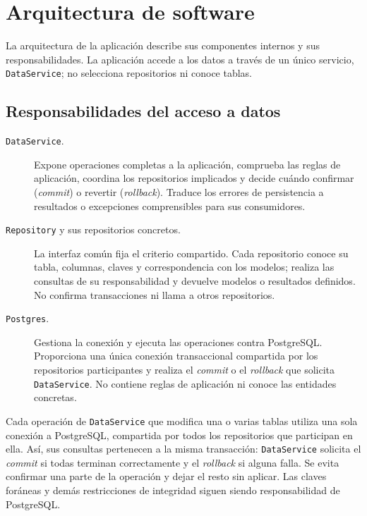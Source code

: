 \chapter{Arquitectura de software}

La arquitectura de la aplicación describe sus componentes internos y sus
responsabilidades. La aplicación accede a los datos a través de un único servicio,
\texttt{DataService}; no selecciona repositorios ni conoce tablas.

\section{Responsabilidades del acceso a datos}

\begin{description}
    \item[\texttt{DataService}.] Expone operaciones completas a la aplicación,
    comprueba las reglas de aplicación, coordina los repositorios implicados y
    decide cuándo confirmar (\textit{commit}) o revertir (\textit{rollback}).
    Traduce los errores de persistencia a resultados o excepciones comprensibles
    para sus consumidores.
    \item[\texttt{Repository} y sus repositorios concretos.] La interfaz común
    fija el criterio compartido. Cada repositorio conoce su tabla, columnas,
    claves y correspondencia con los modelos; realiza las consultas de su
    responsabilidad y devuelve modelos o resultados definidos. No confirma
    transacciones ni llama a otros repositorios.
    \item[\texttt{Postgres}.] Gestiona la conexión y ejecuta las operaciones
    contra PostgreSQL. Proporciona una única conexión transaccional compartida
    por los repositorios participantes y realiza el \textit{commit} o el
    \textit{rollback} que solicita \texttt{DataService}. No contiene reglas de
    aplicación ni conoce las entidades concretas.
\end{description}

Cada operación de \texttt{DataService} que modifica una o varias tablas utiliza
una sola conexión a PostgreSQL, compartida por todos los repositorios que
participan en ella. Así, sus consultas pertenecen a la misma transacción:
\texttt{DataService} solicita el \textit{commit} si todas terminan correctamente
y el \textit{rollback} si alguna falla. Se evita confirmar una parte de la
operación y dejar el resto sin aplicar. Las claves foráneas y demás restricciones
de integridad siguen siendo responsabilidad de PostgreSQL.

